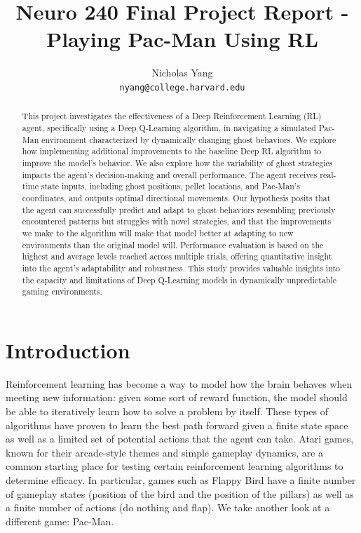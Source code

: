 \documentclass{article} %
\title{Neuro 240 Final Project Report - \\Playing Pac-Man Using RL}
\author{Nicholas Yang\\
\texttt{nyang@college.harvard.edu}}
\begin{document}
\maketitle

\begin{abstract}
  This project investigates the effectiveness of a Deep Reinforcement Learning (RL) agent, specifically using a Deep Q-Learning algorithm, in navigating a simulated Pac-Man environment characterized by dynamically changing ghost behaviors. We explore how implementing additional improvements to the baseline Deep RL algorithm to improve the model's behavior. We also explore how the variability of ghost strategies impacts the agent's decision-making and overall performance. The agent receives real-time state inputs, including ghost positions, pellet locations, and Pac-Man's coordinates, and outputs optimal directional movements. Our hypothesis posits that the agent can successfully predict and adapt to ghost behaviors resembling previously encountered patterns but struggles with novel strategies, and that the improvements we make to the algorithm will make that model better at adapting to new environments than the original model will. Performance evaluation is based on the highest and average levels reached across multiple trials, offering quantitative insight into the agent's adaptability and robustness. This study provides valuable insights into the capacity and limitations of Deep Q-Learning models in dynamically unpredictable gaming environments.
\end{abstract}

\section{Introduction}

Reinforcement learning has become a way to model how the brain behaves when meeting new information: given some sort of reward function, the model should be able to iteratively learn how to solve a problem by itself. These types of algorithms have proven to learn the best path forward given a finite state space as well as a limited set of potential actions that the agent can take. Atari games, known for their arcade-style themes and simple gameplay dynamics, are a common starting place for testing certain reinforcement learning algorithms to determine efficacy. In particular, games such as Flappy Bird have a finite number of gameplay states (position of the bird and the position of the pillars) as well as a finite number of actions (do nothing and flap). We take another look at a different game: Pac-Man.
\end{document}
